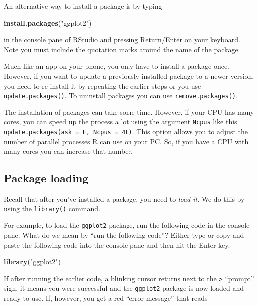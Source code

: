 \documentclass[
  12pt,
  oneside]{book}
\newenvironment{Shaded}{\begin{snugshade}}{\end{snugshade}}
\newcommand{\FunctionTok}[1]{\textcolor[rgb]{0.13,0.29,0.53}{\textbf{#1}}}
\newcommand{\NormalTok}[1]{#1}
\newcommand{\StringTok}[1]{\textcolor[rgb]{0.31,0.60,0.02}{#1}}
\begin{document}
An alternative way to install a package is by typing

\begin{Shaded}
\begin{Highlighting}[]
\FunctionTok{install.packages}\NormalTok{(}\StringTok{"ggplot2"}\NormalTok{)}
\end{Highlighting}
\end{Shaded}

in the console pane of RStudio and pressing Return/Enter on your keyboard. Note you must include the quotation marks around the name of the package.

Much like an app on your phone, you only have to install a package once. However, if you want to update a previously installed package to a newer version, you need to re-install it by repeating the earlier steps or you use \texttt{update.packages()}. To uninstall packages you can use \texttt{remove.packages()}.

The installation of packages can take some time. However, if your CPU has many cores, you can speed up the process a lot using the argument \texttt{Ncpus} like this \texttt{update.packages(ask\ =\ F,\ Ncpus\ =\ 4L)}. This option allows you to adjust the number of parallel processes R can use on your PC. So, if you have a CPU with many cores you can increase that number.

\hypertarget{package-loading}{%
\subsection{Package loading}\label{package-loading}}

Recall that after you've installed a package, you need to \emph{load it}. We do this by using the \texttt{library()} command. 

For example, to load the \texttt{ggplot2} package, run the following code in the console pane. What do we mean by ``run the following code''? Either type or copy-and-paste the following code into the console pane and then hit the Enter key.

\begin{Shaded}
\begin{Highlighting}[]
\FunctionTok{library}\NormalTok{(}\StringTok{"ggplot2"}\NormalTok{)}
\end{Highlighting}
\end{Shaded}

If after running the earlier code, a blinking cursor returns next to the \texttt{\textgreater{}} ``prompt'' sign, it means you were successful and the \texttt{ggplot2} package is now loaded and ready to use. If, however, you get a red ``error message'' that reads
\end{document}
